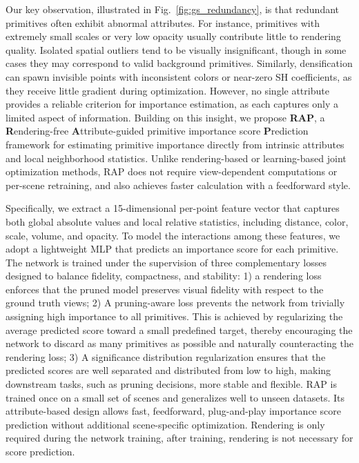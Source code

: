 Our key observation, illustrated in Fig.~\ref{fig:gs_redundancy}, is that redundant primitives often exhibit abnormal attributes. For instance, primitives with extremely small scales or very low opacity usually contribute little to rendering quality. Isolated spatial outliers tend to be visually insignificant, though in some cases they may correspond to valid background primitives. Similarly, densification can spawn invisible points with inconsistent colors or near-zero SH coefficients, as they receive little gradient during optimization.
However, no single attribute provides a reliable criterion for importance estimation, as each captures only a limited aspect of information. 
Building on this insight, we propose \textbf{RAP}, a \textbf{R}endering-free \textbf{A}ttribute-guided primitive importance score \textbf{P}rediction framework for estimating primitive importance directly from intrinsic attributes and local neighborhood statistics. Unlike rendering-based or learning-based joint optimization methods, RAP does not require view-dependent computations or per-scene retraining, and also achieves faster calculation with a feedforward style.

Specifically, we extract a 15-dimensional per-point feature vector that captures both global absolute values and local relative statistics, including distance, color, scale, volume, and opacity. 
To model the interactions among these features, we adopt a lightweight MLP that predicts an importance score for each primitive. The network is trained under the supervision of three complementary losses designed to balance fidelity, compactness, and stability: 1) a rendering loss enforces that the pruned model preserves visual fidelity with respect to the ground truth views; 2) A pruning-aware loss prevents the network from trivially assigning high importance to all primitives. This is achieved by regularizing the average predicted score toward a small predefined target, thereby encouraging the network to discard as many primitives as possible and naturally counteracting the rendering loss; 3) A significance distribution regularization ensures that the predicted scores are well separated and distributed from low to high, making downstream tasks, such as pruning decisions, more stable and flexible.
RAP is trained once on a small set of scenes and generalizes well to unseen datasets. Its attribute-based design allows fast, feedforward, plug-and-play importance score prediction without additional scene-specific optimization.  Rendering is only required during the network training, after training, rendering is not necessary for score prediction.

